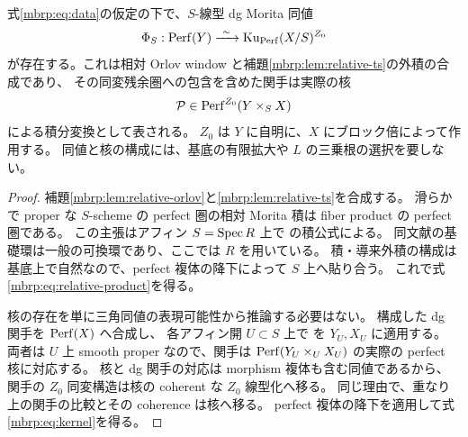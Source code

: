 \begin{theorem}
\label{mbrp:thm:relative-product}
式\eqref{mbrp:eq:data}の仮定の下で、$S$-線型 dg Morita 同値
\begin{equation}\label{mbrp:eq:relative-product}
 \Phi_S:\operatorname{Perf}(Y)\xrightarrow{\ \sim\ }
                 \operatorname{Ku}_{\operatorname{Perf}}(X/S)^{Z_0}
\end{equation}
が存在する。これは相対 Orlov window と補題\ref{mbrp:lem:relative-ts}の外積の合成であり、
その同変残余圏への包含を含めた関手は実際の核
\begin{equation}\label{mbrp:eq:kernel}
 \mathcal P\in\operatorname{Perf}^{Z_0}(Y\times_S X)
\end{equation}
による積分変換として表される。
$Z_0$ は $Y$ に自明に、$X$ にブロック倍によって作用する。
同値と核の構成には、基底の有限拡大や $L$ の三乗根の選択を要しない。
\end{theorem}
\begin{proof}
補題\ref{mbrp:lem:relative-orlov}と\ref{mbrp:lem:relative-ts}を合成する。
滑らかで proper な $S$-scheme の perfect 圏の相対 Morita 積は
fiber product の perfect 圏である。
この主張はアフィン $S=\operatorname{Spec} R$ 上で
\cite[Lemma~8.11とTheorem~8.15]{MBRPToenMorita}の積公式による。
同文献の基礎環は一般の可換環であり、ここでは $R$ を用いている。
積・導来外積の構成は基底上で自然なので、perfect 複体の降下によって $S$ 上へ貼り合う。
これで式\eqref{mbrp:eq:relative-product}を得る。

核の存在を単に三角同値の表現可能性から推論する必要はない。
構成した dg 関手を $\operatorname{Perf}(X)$ へ合成し、
各アフィン開 $U\subset S$ 上で
\cite[Theorem~8.15]{MBRPToenMorita}を $Y_U,X_U$ に適用する。
両者は $U$ 上 smooth proper なので、関手は
$\operatorname{Perf}(Y_U\times_U X_U)$ の実際の perfect 核に対応する。
核と dg 関手の対応は morphism 複体も含む同値であるから、
関手の $Z_0$ 同変構造は核の coherent な $Z_0$ 線型化へ移る。
同じ理由で、重なり上の関手の比較とその coherence は核へ移る。
perfect 複体の降下を適用して式\eqref{mbrp:eq:kernel}を得る。
\end{proof}

